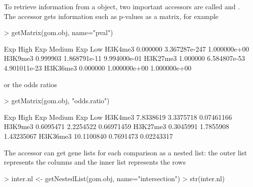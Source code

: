 \documentclass{article}
\begin{document}
To retrieve information from a  object, two important accessors are called  and . The  accessor gets information such as p-values as a matrix, for example
\begin{Schunk}
\begin{Sinput}
> getMatrix(gom.obj, name="pval")
\end{Sinput}
\begin{Soutput}
         Exp High    Exp Medium      Exp Low
H3K4me3  0.000000 3.367287e-247 1.000000e+00
H3K9me3  0.999903  1.868791e-11 9.994000e-01
H3K27me3 1.000000  6.584807e-53 4.901011e-23
H3K36me3 0.000000  1.000000e+00 1.000000e+00
\end{Soutput}
\end{Schunk}
or the odds ratios
\begin{Schunk}
\begin{Sinput}
> getMatrix(gom.obj, "odds.ratio")
\end{Sinput}
\begin{Soutput}
           Exp High Exp Medium    Exp Low
H3K4me3   7.8338619  3.3375718 0.07461166
H3K9me3   0.6095471  2.2254522 0.66971459
H3K27me3  0.3045991  1.7855908 1.43235067
H3K36me3 10.1100840  0.7691473 0.02243317
\end{Soutput}
\end{Schunk}
The  accessor can get gene lists for each comparison as a nested list: the outer list represents the columns and the inner list represents the rows
\begin{Schunk}
\begin{Sinput}
> inter.nl <- getNestedList(gom.obj, name="intersection")
> str(inter.nl)
\end{Sinput}
\end{Schunk}
\end{document}
